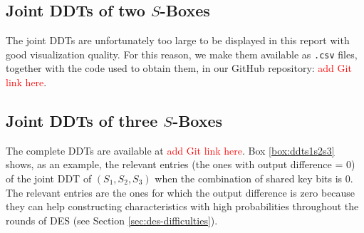 \documentclass{report}
\begin{document}









\subsection{Joint DDTs of two $S$-Boxes}

The joint DDTs are unfortunately too large to be displayed in this report with good visualization quality. For this reason, we make them available as \texttt{.csv} files, together with the code used to obtain them, in our GitHub repository: \textcolor{red}{add Git link here}.

\subsection{Joint DDTs of three $S$-Boxes}

The complete DDTs are available at \textcolor{red}{add Git link here}. Box \ref{box:ddts1s2s3} shows, as an example, the relevant entries (the ones with output difference = 0) of the joint DDT of $(S_1, S_2, S_3)$ when the combination of shared key bits is 0. The relevant entries are the ones for which the output difference is zero because they can help constructing characteristics with high probabilities throughout the rounds of DES (see Section \ref{sec:des-difficulties}).\\
\end{document}
